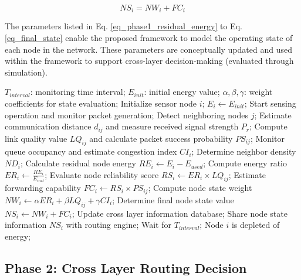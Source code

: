 \documentclass[a4paper,fleqn]{cas-dc}
\numberwithin{equation}{section}
\begin{document}
\begin{equation}
NS_i = NW_i + FC_i
\label{eq_final_state}
\end{equation}

The parameters listed in Eq. \ref{eq_phase1_residual_energy} to Eq. \ref{eq_final_state} enable the proposed framework to model the operating state of each node in the network. These parameters are conceptually updated and used within the framework to support cross-layer decision-making (evaluated through simulation).

\begin{algorithm}
\caption{Node State Evaluation}
\begin{algorithmic}[1]
\REQUIRE 
    $T_{interval}$: monitoring time interval;
    $E_{init}$: initial energy value;
    $\alpha, \beta, \gamma$: weight coefficients for state evaluation;
\STATE Initialize sensor node $i$;
\STATE $E_i \leftarrow E_{init}$;
\STATE Start sensing operation and monitor packet generation;
\REPEAT
    \STATE Detect neighboring nodes $j$;
    \STATE Estimate communication distance $d_{ij}$ and measure received signal strength $P_r$;
    \STATE Compute link quality value $LQ_{ij}$ and calculate packet success probability $PS_{ij}$;
    \STATE Monitor queue occupancy and estimate congestion index $CI_i$;
    \STATE Determine neighbor density $ND_i$;
        \STATE Calculate residual node energy $RE_i \leftarrow E_i - E_{used}$;
        \STATE Compute energy ratio $ER_i \leftarrow \frac{RE_i}{E_{init}}$;
        \STATE Evaluate node reliability score $RS_i \leftarrow ER_i \times LQ_{ij}$;
        \STATE Estimate forwarding capability $FC_i \leftarrow RS_i \times PS_{ij}$;
        \STATE Compute node state weight $NW_i \leftarrow \alpha ER_i + \beta LQ_{ij} + \gamma CI_i$;
        \STATE Determine final node state value $NS_i \leftarrow NW_i + FC_i$;
        \STATE Update cross layer information database;
        \STATE Share node state information $NS_i$ with routing engine;
        \STATE Wait for $T_{interval}$;
    \ELSE
        \STATE Node $i$ is depleted of energy;
        \RETURN
    \ENDIF
{}
\end{algorithmic}
\end{algorithm}

\subsection{Phase 2: Cross Layer Routing Decision}
\end{document}
